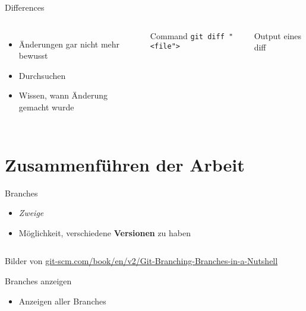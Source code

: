 \documentclass{beamer}
\begin{document}
    \begin{frame}{Differences}
      \begin{columns}
          \begin{itemize}[<+->]
            \item Änderungen gar nicht mehr bewusst
            \item Durchsuchen
            \item Wissen, wann Änderung gemacht wurde
          \end{itemize}
          \begin{block}{Command}
            \texttt{git diff "<file">}
          \end{block}

          \begin{block}{Output eines diff}

          \end{block}
      \end{columns}
    \end{frame}

  \section[Merge]{Zusammenführen der Arbeit}


    \begin{frame}{Branches}
      \begin{itemize}
        \item<+-> \textit{Zweige}
        \item<+-> Möglichkeit, verschiedene \textbf{Versionen} zu haben
      \end{itemize}
      \begin{columns}
       \end{columns}
      \tiny{Bilder von \url{git-scm.com/book/en/v2/Git-Branching-Branches-in-a-Nutshell}}
    \end{frame}

    \begin{frame}{Branches anzeigen}
      \begin{itemize}
        \item<+-> Anzeigen aller Branches
      \end{itemize}
    \end{frame}
\end{document}

